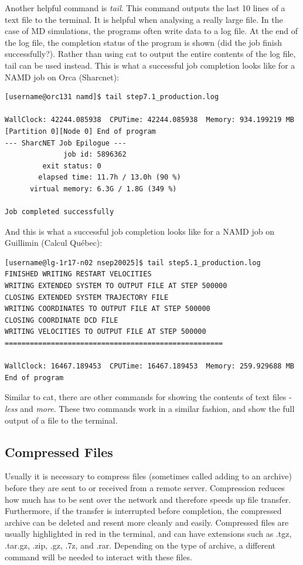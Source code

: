 \documentclass[12pt]{article}
\begin{document}
\quad\enskip\quad Another helpful command is \textit{tail}. This command outputs the last 10 lines of a text file to the terminal. It is helpful when analysing a really large file. In the case of MD simulations, the programs often write data to a log file. At the end of the log file, the completion status of the program is shown (did the job finish successfully?). Rather than using cat to output the entire contents of the log file, tail can be used instead. This is what a successful job completion looks like for a NAMD job on Orca (Sharcnet):
\begin{lstlisting}[numbers=none]
[username@orc131 namd]$ tail step7.1_production.log 

WallClock: 42244.085938  CPUTime: 42244.085938  Memory: 934.199219 MB
[Partition 0][Node 0] End of program
--- SharcNET Job Epilogue ---
              job id: 5896362
         exit status: 0
        elapsed time: 11.7h / 13.0h (90 %)
      virtual memory: 6.3G / 1.8G (349 %)

Job completed successfully
\end{lstlisting}
And this is what a successful job completion looks like for a NAMD job on Guillimin (Calcul Qu\'{e}bec):
\begin{lstlisting}[numbers=none]
[username@lg-1r17-n02 nsep20025]$ tail step5.1_production.log 
FINISHED WRITING RESTART VELOCITIES
WRITING EXTENDED SYSTEM TO OUTPUT FILE AT STEP 500000
CLOSING EXTENDED SYSTEM TRAJECTORY FILE
WRITING COORDINATES TO OUTPUT FILE AT STEP 500000
CLOSING COORDINATE DCD FILE
WRITING VELOCITIES TO OUTPUT FILE AT STEP 500000
====================================================

WallClock: 16467.189453  CPUTime: 16467.189453  Memory: 259.929688 MB
End of program
\end{lstlisting}

\quad\enskip\quad Similar to cat, there are other commands for showing the contents of text files - \textit{less} and \textit{more}. These two commands work in a similar fashion, and show the full output of a file to the terminal.

\subsection{Compressed Files}

\quad Usually it is necessary to compress files (sometimes called adding to an archive) before they are sent to or received from a remote server. Compression reduces how much has to be sent over the network and therefore speeds up file transfer. Furthermore, if the transfer is interrupted before completion, the compressed archive can be deleted and resent more cleanly and easily. Compressed files are usually highlighted in red in the terminal, and can have extensions such as .tgz, .tar.gz, .zip, .gz, .7z, and .rar. Depending on the type of archive, a different command will be needed to interact with these files. 
\end{document}
